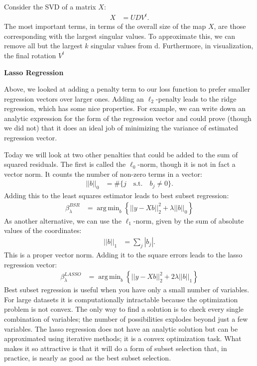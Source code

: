 \documentclass[12pt,hidelinks]{article}
\DeclareMathOperator*{\argmin}{arg\,min}
\numberwithin{equation}{section}
\begin{document}
Consider the SVD of a matrix $X$:
\begin{align}
X &= U D V^t.
\end{align}
The most important terms, in terms of the overall size of the map $X$, are
those corresponding with the largest singular values. To approximate this, we
can remove all but the largest $k$ singular values from d. Furthermore, in
visualization, the final rotation $V^t$

\textbf{Lasso Regression}

Above, we looked at adding a penalty term to our loss function to prefer
smaller regression vectors over larger ones. Adding an $\ell_2$-penalty leads
to the ridge regression, which has some nice properties. For example, we can
write down an analytic expression for the form of the regression vector and
could prove (though we did not) that it does an ideal job of minimizing the
variance of estimated regression vector.

Today we will look at two other penalties that could be added to the sum of
squared residuals. The first is called the $\ell_0$-norm, though it is not
in fact a vector norm. It counts the number of non-zero terms in a vector:
\begin{align}
|| b ||_0 &= \# \{ j \quad \text{s.t.} \quad b_j \neq 0 \}.
\end{align}
Adding this to the least squares estimator leads to best subset regression:
\begin{align}
\beta^{BSR}_{\lambda} &= \argmin_b \left\{ || y - Xb||_2^2 + \lambda ||b||_0 \right\}
\end{align}
As another alternative, we can use the $\ell_1$-norm, given by the sum of
absolute values of the coordinates:
\begin{align}
|| b ||_1 &= \sum_j | b_j |.
\end{align}
This is a proper vector norm. Adding it to the square errors leads to the
lasso regression vector:
\begin{align}
\beta^{LASSO}_{\lambda} &= \argmin_b \left\{ || y - Xb||_2^2 + 2 \lambda ||b||_1 \right\}
\end{align}
Best subset regression is useful when you have only a small number of variables.
For large datasets it is computationally intractable because the optimization
problem is not convex. The only way to find a solution is to check every single
combination of variables; the number of possibilities explodes beyond just a few
variables. The lasso regression does not have an analytic solution but can be
approximated using iterative methods; it is a convex optimization task. What
makes it so attractive is that it will do a form of subset selection that, in
practice, is nearly as good as the best subset selection.
\end{document}
